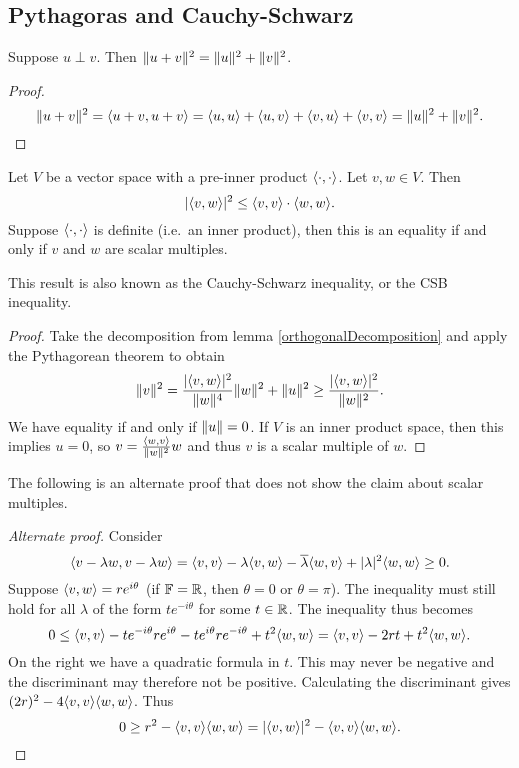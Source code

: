 \subsection{Pythagoras and Cauchy-Schwarz}
\begin{theorem} \label{Pythagoras}
Suppose $u\perp v$. Then $\lVert u+v\rVert^2 = \lVert u\rVert^2 + \lVert v\rVert^2$.
\end{theorem}
\begin{proof}
\[ \norm{u+v}^2 = \inner{u+v,u+v} = \inner{u,u}+ \inner{u,v} + \inner{v,u} + \inner{v,v} = \norm{u}^2 + \norm{v}^2. \]
\end{proof}

\begin{theorem} \label{CauchySchwarz}
Let $V$ be a vector space with a pre-inner product $\inner{\cdot,\cdot}$. Let $v,w\in V$. Then
\[ |\inner{v,w}|^2\leq \inner{v,v}\cdot\inner{w,w}. \]
Suppose $\inner{\cdot,\cdot}$ is definite (i.e.\ an inner product), then
this is an equality \textup{if and only if} $v$ and $w$ are scalar multiples.
\end{theorem}
This result is also known as the Cauchy-Schwarz inequality, or the CSB inequality.
\begin{proof}
Take the decomposition from lemma \ref{orthogonalDecomposition} and apply the Pythagorean theorem to obtain
\[ \norm{v}^2 = \frac{|\inner{v,w}|^2}{\norm{w}^4}\norm{w}^2 + \norm{u}^2 \geq \frac{|\inner{v,w}|^2}{\norm{w}^2}. \]
We have equality if and only if $\lVert u\rVert = 0$. If $V$ is an inner product space, then this implies $u = 0$, so $v = \frac{\inner{w,v}}{\norm{w}^2}w$ and thus $v$ is a scalar multiple of $w$.
\end{proof}
The following is an alternate proof that does not show the claim about scalar multiples.
\begin{proof}[Alternate proof]
Consider 
\[ \inner{v-\lambda w, v-\lambda w} = \inner{v,v}-\lambda\inner{v,w}-\overline{\lambda}\inner{w,v} + |\lambda|^2 \inner{w,w} \geq 0. \]
Suppose $\inner{v,w}=re^{i\theta}$ (if $\mathbb{F} = \mathbb{R}$, then $\theta=0$ or $\theta = \pi$). The inequality must still hold for all $\lambda$ of the form $te^{-i\theta}$ for some $t\in \mathbb{R}$. The inequality thus becomes
\[ 0\leq \inner{v,v}-te^{-i\theta}re^{i\theta}-te^{i\theta}re^{-i\theta} + t^2 \inner{w,w} = \inner{v,v}-2rt + t^2 \inner{w,w}. \]
On the right we have a quadratic formula in $t$. This may never be negative and the discriminant may therefore not be positive. Calculating the discriminant gives $(2r)^2 - 4\inner{v,v}\inner{w,w}$. Thus
\[ 0\geq r^2 - \inner{v,v}\inner{w,w} = |\inner{v,w}|^2 - \inner{v,v}\inner{w,w}. \]
\end{proof}

